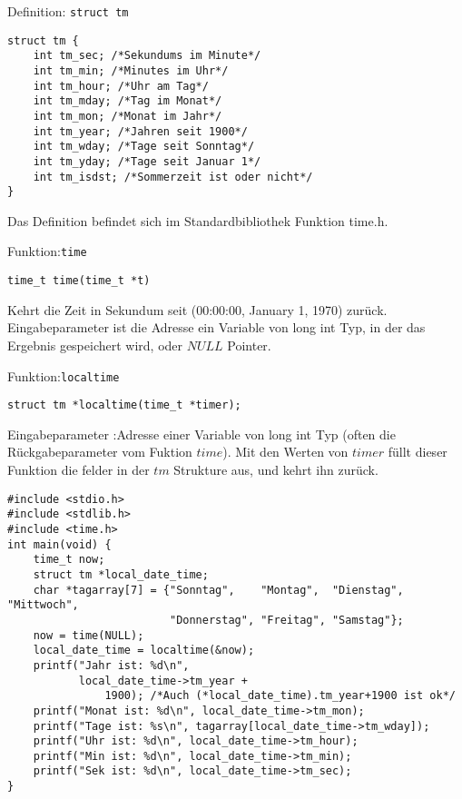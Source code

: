 \begin{myexampleblock}{Definition: \texttt{struct tm}}
\begin{lstlisting}
struct tm {
    int tm_sec; /*Sekundums im Minute*/
    int tm_min; /*Minutes im Uhr*/
    int tm_hour; /*Uhr am Tag*/
    int tm_mday; /*Tag im Monat*/
    int tm_mon; /*Monat im Jahr*/
    int tm_year; /*Jahren seit 1900*/
    int tm_wday; /*Tage seit Sonntag*/
    int tm_yday; /*Tage seit Januar 1*/
    int tm_isdst; /*Sommerzeit ist oder nicht*/
}
\end{lstlisting}
Das Definition befindet sich im Standardbibliothek Funktion time.h.
\end{myexampleblock}
\begin{myexampleblock}{Funktion:\texttt{time}}
\begin{lstlisting}
time_t time(time_t *t)
\end{lstlisting}
\vspace{-0.4cm}
Kehrt die Zeit in Sekundum seit (00:00:00, January 1, 1970) zurück.
Eingabeparameter ist die Adresse ein Variable von long int Typ, in der
das Ergebnis gespeichert wird, oder $NULL$ Pointer.
\end{myexampleblock}
\begin{myexampleblock}{Funktion:\texttt{localtime}}
\begin{lstlisting}
struct tm *localtime(time_t *timer);
\end{lstlisting}
\vspace{-0.4cm}
Eingabeparameter :Adresse einer Variable von long int Typ (often die Rückgabeparameter vom Fuktion $time$).
Mit den Werten von $timer$ füllt dieser Funktion die felder in der $tm$ Strukture aus, und kehrt ihn zurück.
\end{myexampleblock}
\begin{lstlisting}
#include <stdio.h>
#include <stdlib.h>
#include <time.h>
int main(void) {
    time_t now;
    struct tm *local_date_time;
    char *tagarray[7] = {"Sonntag",    "Montag",  "Dienstag", "Mittwoch",
                         "Donnerstag", "Freitag", "Samstag"};
    now = time(NULL);
    local_date_time = localtime(&now);
    printf("Jahr ist: %d\n",
           local_date_time->tm_year +
               1900); /*Auch (*local_date_time).tm_year+1900 ist ok*/
    printf("Monat ist: %d\n", local_date_time->tm_mon);
    printf("Tage ist: %s\n", tagarray[local_date_time->tm_wday]);
    printf("Uhr ist: %d\n", local_date_time->tm_hour);
    printf("Min ist: %d\n", local_date_time->tm_min);
    printf("Sek ist: %d\n", local_date_time->tm_sec);
}
\end{lstlisting}
